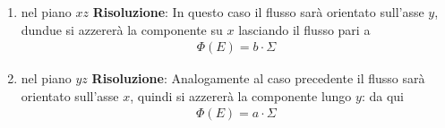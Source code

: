 \documentclass{book}
\begin{document}
\begin{enumerate}
\begin{enumerate}
        \item nel piano $xz$
        \newline
        \textbf{Risoluzione}: In questo caso il flusso sarà orientato sull'asse $y$, dundue si azzererà la componente su $x$ lasciando il flusso pari a 
        \begin{align*}
            \Phi (E) = b \cdot \Sigma 
        \end{align*}

        \item nel piano $yz$
        \newline
        \textbf{Risoluzione}: Analogamente al caso precedente il flusso sarà orientato sull'asse $x$, quindi si azzererà la componente lungo $y$: da qui
        \begin{align*}
            \Phi (E) = a \cdot \Sigma 
        \end{align*}
    \end{enumerate}


\end{enumerate}
\end{document}
